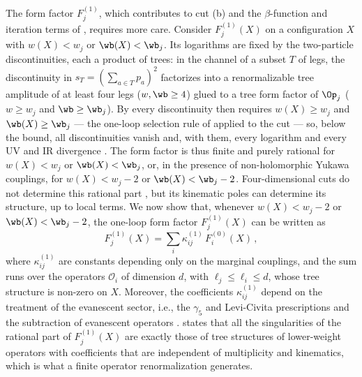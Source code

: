 The form factor $F^{(1)}_j$, which contributes to cut (b) and the $\beta$-function and iteration terms of , requires more care.
Consider $F^{(1)}_j(X)$ on a configuration $X$ with $w(X) < w_j$ or $\wb(X) < \wb_j$.
Its logarithms are fixed by the two-particle discontinuities, each a product of trees: in the channel of a subset $T$ of legs, 
the discontinuity in $s_T = (\sum_{a \in T} p_a)^2$ factorizes into a renormalizable tree amplitude of at least four legs ($w,\wb \ge 4$)
glued to a tree form factor of $\Op_j$ ($w \ge w_j$ and $\wb \ge \wb_j$).
By  every discontinuity then requires $w(X) \ge w_j$ and $\wb(X) \ge \wb_j$ --- the one-loop selection rule of  applied to the cut --- so, below the bound, all discontinuities vanish and, with them, every logarithm and every UV and IR divergence \cite{Craig:2019wmo}.
The form factor is thus finite and purely rational for $w(X) < w_j$ or $\wb(X) < \wb_j$, or, in the presence of non-holomorphic Yukawa couplings, for $w(X) <w_j-2$ or $\wb(X) <\wb_j-2$.
Four-dimensional cuts do not determine this rational part \cite{Bern:1994zx}, 
but its kinematic poles can determine its structure, up to local terms.
We now show that, whenever $w(X) < w_j - 2$ or $\wb(X) < \wb_j - 2$, the one-loop form factor $F^{(1)}_j(X)$ can be written as
\begin{equation}
\label{eq:contact}
F^{(1)}_j(X) = \sum_i \kappa^{(1)}_{ij}\, F^{(0)}_i(X) \,,
\end{equation}
where $\kappa^{(1)}_{ij}$ are constants depending only on the marginal couplings, and the sum
runs over the operators $\mathcal{O}_i$ of dimension $d$, with $\ell_j \le \ell_i \le d$, whose tree structure is
non-zero on $X$.
Moreover, the coefficients $\kappa^{(1)}_{ij}$ depend on the treatment of the evanescent sector, i.e., the $\gamma_5$ and Levi-Civita prescriptions and the subtraction of evanescent operators \cite{Buras:1989xd,Dugan:1990df,Herrlich:1994kh}.
 states that all the singularities of the rational part of $F^{(1)}_j(X)$ are exactly those of tree structures of lower-weight operators with coefficients that are independent of 
multiplicity and 
kinematics, which is what a finite operator renormalization generates.

